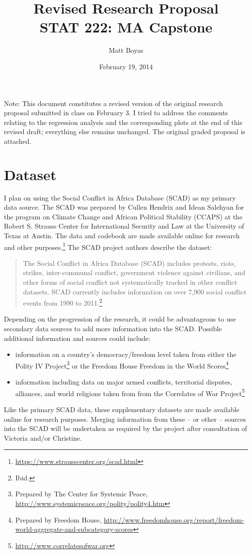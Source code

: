\documentclass{article}
\begin{document}
\title{Revised Research Proposal\\STAT 222: MA Capstone}
\author{Matt Boyas}

\date{February 19, 2014}
\maketitle
Note: This document constitutes a revised version of the original research proposal submitted in class on February 3.  I tried to address the comments relating to the regression analysis and the corresponding plots at the end of this revised draft; everything else remains unchanged.  The original graded proposal is attached.

\section{Dataset}
I plan on using the Social Conflict in Africa Database (SCAD) as my primary data source.  The SCAD was prepared by Cullen Hendrix and Idean Salehyan for the program on Climate Change and African Political Stability (CCAPS) at the Robert S. Strauss Center for International Security and Law at the University of Texas at Austin.  The data and codebook are made available online for research and other purposes.\footnote{\url{https://www.strausscenter.org/scad.html}}  The SCAD project authors describe the dataset:

\blockquote{The Social Conflict in Africa Database (SCAD) includes protests, riots, strikes, inter-communal conflict, government violence against civilians, and other forms of social conflict not systematically tracked in other conflict datasets. SCAD currently includes information on over 7,900 social conflict events from 1990 to 2011.\footnote{Ibid.}}
Depending on the progression of the research, it could be advantageous to use secondary data sources to add more information into the SCAD.  Possible additional information and sources could include:
\begin{itemize}
\item information on a country's democracy/freedom level taken from either the Polity IV Project\footnote{Prepared by The Center for Systemic Peace, \url{http://www.systemicpeace.org/polity/polity4.htm}} or the Freedom House Freedom in the World Scores\footnote{Prepared by Freedom House, \url{http://www.freedomhouse.org/report/freedom-world-aggregate-and-subcategory-scores}}
\item information including data on major armed conflicts, territorial disputes, alliances, and world religions taken from from the Correlates of War Project\footnote{\url{http://www.correlatesofwar.org}}
\end{itemize}
Like the primary SCAD data, these supplementary datasets are made available online for research purposes.  Merging information from these -- or other -- sources into the SCAD will be undertaken as required by the project after consultation of Victoria and/or Christine.
\end{document}
